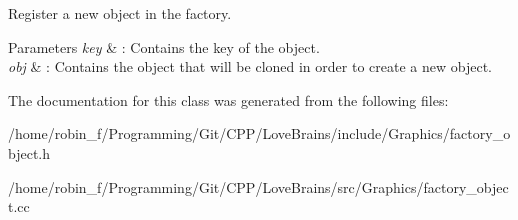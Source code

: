Register a new object in the factory. 


\begin{DoxyParams}{Parameters}
{\em key} & \+: Contains the key of the object. \\
\hline
{\em obj} & \+: Contains the object that will be cloned in order to create a new object. \\
\hline
\end{DoxyParams}


The documentation for this class was generated from the following files\+:\begin{DoxyCompactItemize}
\item 
/home/robin\+\_\+f/\+Programming/\+Git/\+C\+P\+P/\+Love\+Brains/include/\+Graphics/factory\+\_\+object.\+h\item 
/home/robin\+\_\+f/\+Programming/\+Git/\+C\+P\+P/\+Love\+Brains/src/\+Graphics/factory\+\_\+object.\+cc\end{DoxyCompactItemize}
